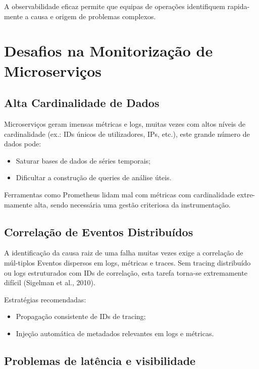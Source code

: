 A observabilidade eficaz permite que equipas de operações identifiquem rapida-mente a causa e origem de problemas complexos.

\section{Desafios na Monitorização de Microserviços}

\subsection{Alta Cardinalidade de Dados}

Microserviços geram imensas métricas e logs, muitas vezes com altos níveis de cardinalidade (ex.: IDs únicos de utilizadores, IPs, etc.), este grande número de dados pode:

\begin{itemize}
    \item Saturar bases de dados de séries temporais;
    \item Dificultar a construção de queries de análise úteis.
\end{itemize}

Ferramentas como Prometheus lidam mal com métricas com cardinalidade extre-mamente alta, sendo necessária uma gestão criteriosa da instrumentação.

\subsection{Correlação de Eventos Distribuídos}

A identificação da causa raiz de uma falha muitas vezes exige a correlação de múl-tiplos Eventos dispersos em logs, métricas e traces.
Sem tracing distribuído ou logs estruturados com IDs de correlação, esta tarefa torna-se extremamente difícil (Sigelman et al., 2010).

Estratégias recomendadas:

\begin{itemize}
    \item Propagação consistente de IDs de tracing;
    \item Injeção automática de metadados relevantes em logs e métricas.
\end{itemize}


\subsection{Problemas de latência e visibilidade}

